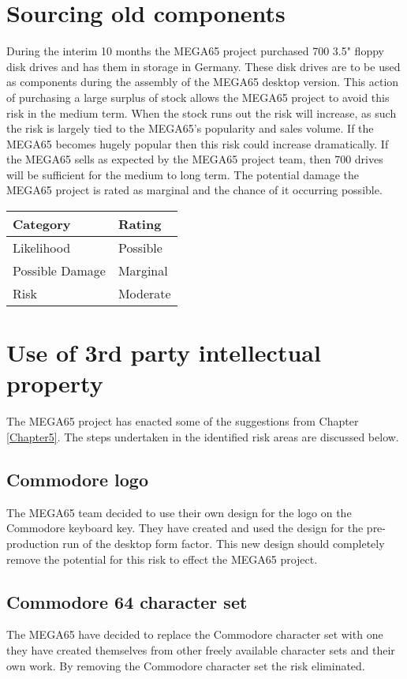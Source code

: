 \section{Sourcing old components}
During the interim 10 months the MEGA65 project purchased 700 3.5" floppy disk drives and has them in storage in Germany. These disk drives are to be used as components during the assembly of the MEGA65 desktop version. This action of purchasing a large surplus of stock allows the MEGA65 project to avoid this risk in the medium term. When the stock runs out the risk will increase, as such the risk is largely tied to the MEGA65's popularity and sales volume. If the MEGA65 becomes hugely popular then this risk could increase dramatically. If the MEGA65 sells as expected by the MEGA65 project team, then 700 drives will be sufficient for the medium to long term. The potential damage the MEGA65 project is rated as marginal and the chance of it occurring possible. \\

\begin{tabular}{l|l} %
    	\textbf{Category} 	&	\textbf{Rating} \\
      \hline
     Likelihood			&	Possible \\
     Possible Damage 	& 	Marginal \\
     Risk 				&	Moderate		\\	
    \end{tabular}


\section{Use of 3rd party intellectual property}
The MEGA65 project has enacted some of the suggestions from Chapter \ref{Chapter5}. The steps undertaken in the identified risk areas are discussed below.

\subsection{Commodore logo}
The MEGA65 team decided to use their own design for the logo on the Commodore keyboard key. They have created and used the design for the pre-production run of the desktop form factor. This new design should completely remove the potential for this risk to effect the MEGA65 project.

\subsection{Commodore 64 character set}
The MEGA65 have decided to replace the Commodore character set with one they have created themselves from other freely available character sets and their own work. By removing the Commodore character set the risk eliminated. 

